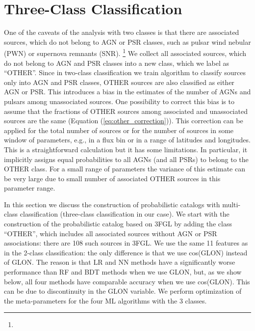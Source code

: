 \section{Three-Class Classification}

One of the caveats of the analysis with two classes is that there are associated sources, which do not belong to AGN or PSR classes, such as pulsar wind nebular (PWN) or supernova remnants (SNR).%
\footnote{}
We collect all associated sources, which do not belong to AGN and PSR classes into a new class, which we label as ``OTHER''.
Since in two-class classification we train algorithm to classify sources only into AGN and PSR classes, OTHER sources are also classified as either AGN or PSR.
This introduces a bias in the estimates of the number of AGNs and pulsars among unassociated sources.
One possibility to correct this bias is to assume that the fractions of OTHER sources among associated and unassociated sources are the same (Equation (\ref{eq:other_correction})).
This correction can be applied for the total number of sources or for the number of sources in some window of parameters,
e.g., in a flux bin or in a range of latitudes and longitudes.
This is a straightforward calculation but it has some limitations. In particular, it implicitly assigns equal probabilities to all AGNs (and all PSRs) to belong to the OTHER class.
For a small range of parameters the variance of this estimate can be very large due to small number of associated OTHER sources in this parameter range.

In this section we discuss the construction of probabilistic catalogs with multi-class classification (three-class classification in our case).
We start with the construction of the probabilistic catalog based on 3FGL by adding the class ``OTHER'', which includes all associated sources without AGN or PSR associations: there are 108 such sources in 3FGL.
We use the same 11 features as in the 2-class classification: the only difference is that we use cos(GLON) instead of GLON.
The reason is that LR and NN methods have a significantly worse performance than RF and BDT methods when we use GLON,
but, as we show below, all four methods have comparable accuracy when we use cos(GLON).
This can be due to discontinuity in the GLON variable. 
We perform optimization of the meta-parameters for the four ML algorithms with the 3 classes.


